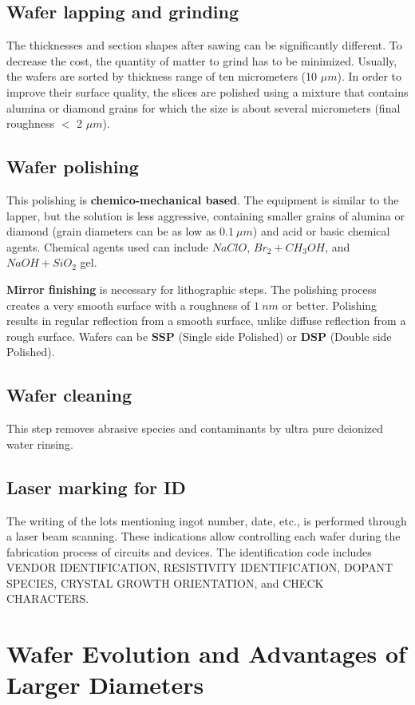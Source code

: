 \documentclass{report}
\begin{document}
\subsection{Wafer lapping and grinding}
The thicknesses and section shapes after sawing
can be significantly different. To decrease the
cost, the quantity of matter to grind has to be
minimized. Usually, the wafers are sorted by
thickness range of ten micrometers (10 $\mu m$).
In order to improve their surface quality, the slices
are polished using a mixture that contains alumina
or diamond grains for which the size is about
several micrometers (final roughness $<$ 2 $\mu m$).

\subsection{Wafer polishing}
This polishing is \textbf{chemico-mechanical based}. The equipment is similar to the lapper, but the solution is less aggressive, containing smaller grains of alumina or diamond (grain diameters can be as low as $0.1~\mu m$) and acid or basic chemical agents. Chemical agents used can include $NaClO$, $Br_{2}+CH_{3}OH$, and $NaOH+SiO_{2}$ gel.

\textbf{Mirror finishing} is necessary for lithographic steps. The polishing process creates a very smooth surface with a roughness of $1~nm$ or better. Polishing results in regular reflection from a smooth surface, unlike diffuse reflection from a rough surface.
Wafers can be \textbf{SSP} (Single side Polished) or \textbf{DSP} (Double side Polished).

\subsection{Wafer cleaning}
This step removes abrasive species and contaminants by ultra pure deionized water rinsing.

\subsection{Laser marking for ID}
The writing of the lots mentioning ingot number, date, etc., is performed through a laser beam scanning. These indications allow controlling each wafer during the fabrication process of circuits and devices. The identification code includes VENDOR IDENTIFICATION, RESISTIVITY IDENTIFICATION, DOPANT SPECIES, CRYSTAL GROWTH ORIENTATION, and CHECK CHARACTERS.

\section{Wafer Evolution and Advantages of Larger Diameters}
\end{document}
